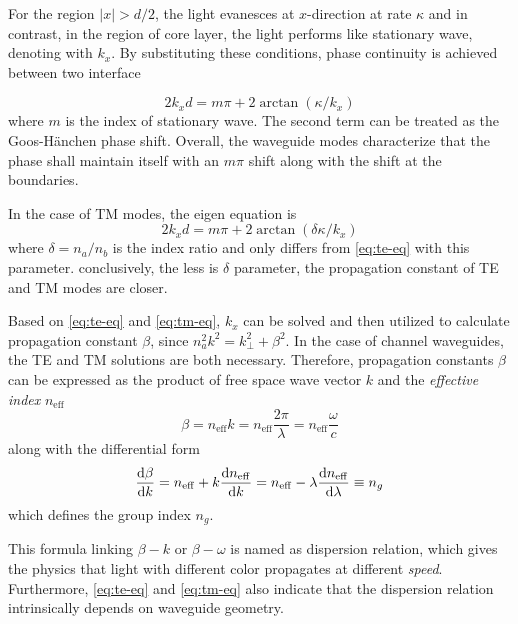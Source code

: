 \documentclass[final]{kuee_en}
\begin{document}
For the region $|x|>d/2$, the light evanesces at $x$-direction at rate $\kappa$ and in contrast, in the region of core layer, the light performs like stationary wave, denoting with $k_x$. By substituting these conditions, phase continuity is achieved between two interface

\begin{equation}\label{eq:te-eq}
    2k_x d = m\pi + 2\arctan(\kappa/k_x)
\end{equation}
where $m$ is the index of stationary wave. The second term can be treated as the Goos-H\"{a}nchen phase shift. Overall, the waveguide modes characterize that the phase shall maintain itself with an $m\pi$ shift along with the shift at the boundaries.

In the case of TM modes, the eigen equation is 
\begin{equation}\label{eq:tm-eq}
    2k_x d = m\pi + 2\arctan(\delta\kappa/k_x)
\end{equation}
where $\delta=n_a/n_b$ is the index ratio and only differs from \autoref{eq:te-eq} with this parameter. conclusively, the less is $\delta$ parameter, the propagation constant of TE and TM modes are closer.

Based on \autoref{eq:te-eq} and \autoref{eq:tm-eq}, $k_x$ can be solved and then utilized to calculate propagation constant $\beta$, since $n_a^2k^2 = k_{\perp}^2 + \beta^2$. In the case of channel waveguides, the TE and TM solutions are both necessary. Therefore, propagation constants $\beta$ can be expressed as the product of free space wave vector $k$ and the \textit{ effective index} $n_{\mathrm{eff}}$
\begin{equation}\label{eq:disp_bk}
    \beta = n_{\mathrm{eff}}k = n_{\mathrm{eff}} \frac{2\pi}{\lambda} = n_{\mathrm{eff}} \frac{\omega}{c}
\end{equation}
along with the differential form
\begin{equation}\label{eq:ng-def}
    \dv{\beta}{k} = n_{\mathrm{eff}} + k \dv{n_{\mathrm{eff}}}{k} = n_{\mathrm{eff}} - \lambda\dv{n_{\mathrm{eff}}}{\lambda} \equiv n_g
\end{equation}
which defines the group index $n_g$.

This formula linking $\beta - k$ or $\beta - \omega$ is named as dispersion relation, which gives the physics that light with different color propagates at different \textit{speed}. Furthermore, \autoref{eq:te-eq} and \autoref{eq:tm-eq} also indicate that the dispersion relation intrinsically depends on waveguide geometry.
\end{document}
